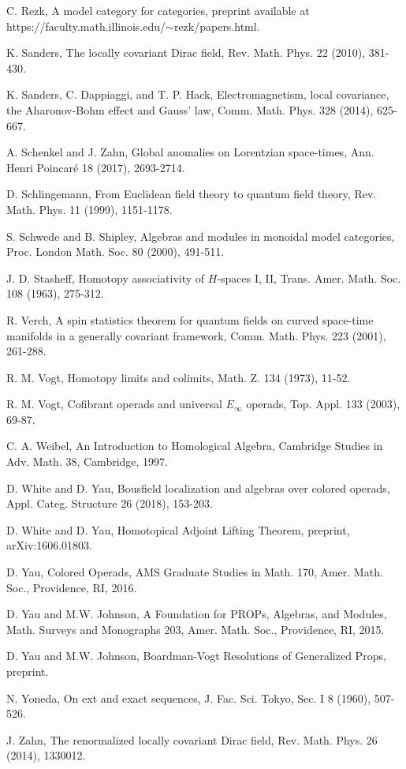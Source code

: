 \documentclass{amsbook}
\numberwithin{section}{chapter}
\numberwithin{subsection}{section}
\numberwithin{equation}{section}
\theoremstyle{plain}
\theoremstyle{definition}
\begin{document}
\begin{thebibliography}{AAAAAA}
C. Rezk, A model category for categories, preprint available at https://faculty.math.illinois.edu/$\sim$rezk/papers.html.

K. Sanders, The locally covariant Dirac field, Rev. Math. Phys. 22 (2010), 381-430.

K. Sanders, C. Dappiaggi, and T. P. Hack, Electromagnetism, local covariance,
the Aharonov-Bohm effect and Gauss' law, Comm. Math. Phys. 328 (2014), 625-667.

A. Schenkel and J. Zahn, Global anomalies on Lorentzian space-times, Ann. Henri Poincar\'{e} 18 (2017), 2693-2714. 

D. Schlingemann, From Euclidean field theory to quantum field theory, Rev. Math. Phys. 11 (1999), 1151-1178.

S. Schwede and B. Shipley, Algebras and modules in monoidal model categories, Proc. London Math. Soc. 80 (2000), 491-511.

J. D. Stasheff, Homotopy associativity of $H$-spaces I, II, Trans. Amer. Math. Soc. 108 (1963), 275-312.

R. Verch, A spin statistics theorem for quantum fields on curved space-time manifolds in a generally covariant framework,  Comm. Math. Phys. 223 (2001), 261-288.

R. M. Vogt, Homotopy limits and colimits, Math. Z. 134 (1973), 11-52.

R. M. Vogt, Cofibrant operads and universal $E_{\infty}$ operads, Top. Appl. 133 (2003), 69-87.

C. A. Weibel, An Introduction to Homological Algebra, Cambridge Studies in Adv. Math. 38, Cambridge, 1997.

D. White and D. Yau, Bousfield localization and algebras over colored operads, Appl. Categ. Structure 26 (2018), 153-203.

D. White and D. Yau, Homotopical Adjoint Lifting Theorem, preprint, arXiv:1606.01803.

D. Yau, Colored Operads, AMS Graduate Studies in Math. 170, Amer. Math. Soc., Providence, RI, 2016.

D. Yau and M.W. Johnson, A Foundation for PROPs, Algebras, and Modules, Math. Surveys and Monographs 203, Amer. Math. Soc., Providence, RI, 2015.

D. Yau and M.W. Johnson, Boardman-Vogt Resolutions of Generalized Props, preprint.

N. Yoneda, On ext and exact sequences, J. Fac. Sci. Tokyo, Sec. I 8 (1960), 507-526.

J. Zahn, The renormalized locally covariant Dirac field, Rev. Math. Phys. 26 (2014), 1330012.

\end{thebibliography}


\printindex
\end{document}

